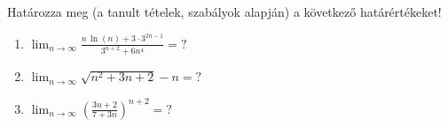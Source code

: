 \documentclass[11pt]{scrartcl}
\begin{document}
Határozza meg (a tanult tételek, szabályok alapján) a következő határértékeket!
\begin{enumerate}
	\item \(\displaystyle
	      \lim_{n \to \infty} \frac{
		      n \, \ln(n) + 3 \cdot 3^{2n - 1}
	      }{
		      3^{n + 2} + 6 n^4
	      } = ?
	      \)

	\item \(\displaystyle
	      \lim_{n \to \infty} \sqrt{n^2 + 3n + 2} - n = ?
	      \)

	\item \(\displaystyle
	      \lim_{n \to \infty} \left(
	      \frac{3n + 2}{7 + 3n}
	      \right)^{n + 2} = ?
	      \)
\end{enumerate}
\end{document}

